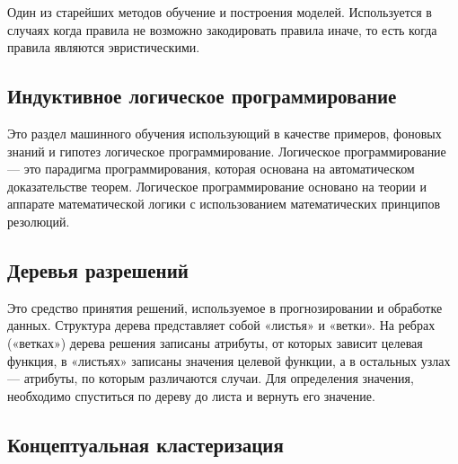 \documentclass{standalone}
\begin{document}
\par Один из старейших методов обучение и построения моделей. Используется в случаях когда правила не возможно закодировать правила иначе, то есть когда правила являются эвристическими.

\subsection{Индуктивное логическое программирование} %

\par Это раздел машинного обучения использующий в качестве примеров, фоновых знаний и гипотез логическое программирование. Логическое программирование — это парадигма программирования, которая основана на автоматическом доказательстве теорем. Логическое программирование основано на теории и аппарате математической логики с использованием математических принципов резолюций.

\subsection{Деревья разрешений} %

\par Это средство принятия решений, используемое в прогнозировании и обработке данных. Структура дерева представляет собой «листья» и «ветки». На ребрах («ветках») дерева решения записаны атрибуты, от которых зависит целевая функция, в «листьях» записаны значения целевой функции, а в остальных узлах — атрибуты, по которым различаются случаи. Для определения значения, необходимо спуститься по дереву до листа и вернуть его значение.

\subsection{Концептуальная кластеризация} %
\end{document}
